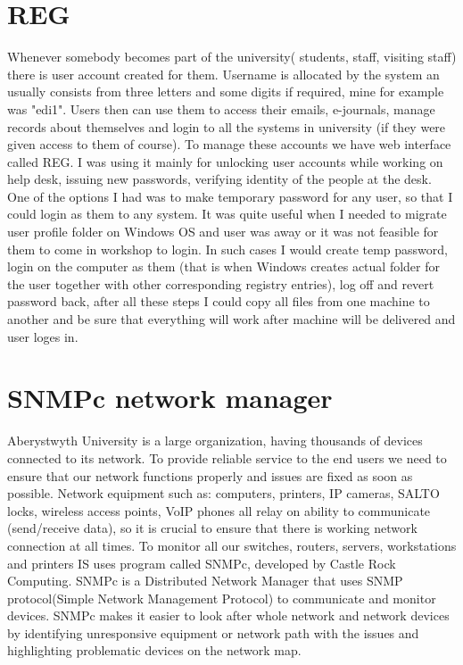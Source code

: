 \documentclass[10pt,a4paper,headinclude=true]{report}
\begin{document}
\section{REG}
Whenever somebody becomes part of the university( students, staff, visiting staff) there is user account created for them. Username is allocated by the system an usually consists from three letters and some digits if required, mine for example was "edi1". Users then can use them to access their emails, e-journals, manage records about themselves and login to all the systems in university (if they were given access to them of course). To manage these accounts we have web interface called REG. I was using it mainly for unlocking user accounts while working on help desk, issuing new passwords, verifying identity of the people at the desk. One of the options I had was to make temporary password for any user, so that I could login as them to any system. It was quite useful when I needed to migrate user profile folder on Windows OS and user was away or it was not feasible for them to come in workshop to login. In such cases I would create temp password, login on the computer as them (that is when Windows creates actual folder for the user together with other corresponding registry entries), log off and revert password back, after all these steps I could copy all files from one machine to another and be sure that everything will work after machine will be delivered and user loges in.
\section{SNMPc network manager}
Aberystwyth University is a large organization, having thousands of devices connected to its network. To provide reliable service to the end users we need to ensure that our network functions properly and issues are fixed as soon as possible. Network equipment such as: computers, printers, IP cameras, SALTO locks, wireless access points, VoIP phones all relay on ability to communicate (send/receive data), so it is crucial to ensure that there is working network connection at all times.  To monitor all our switches, routers, servers, workstations and printers IS uses program called SNMPc, developed by Castle Rock Computing. SNMPc is a Distributed Network Manager \cite{SNMPc} that uses SNMP protocol(Simple Network Management Protocol) to communicate and monitor devices. SNMPc makes it easier to look after whole network and network devices by identifying unresponsive equipment or network path with the issues and highlighting problematic devices on the network map. 
\end{document}
